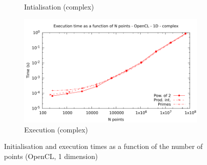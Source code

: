 \documentclass[12pt, a4paper]{article}
\begin{document}
\begin{figure}[H]
\begin{subfigure}{.5\textwidth}
\caption{Intialisation (complex)}
\label{FFTCL1DCI}
\end{subfigure}%
\begin{subfigure}{.5\textwidth}
\centering
\includegraphics[width=.9\linewidth]{graphs/fft-opencl-1d-pow2-c-exec.pdf}
\caption{Execution (complex)}
\label{FFTCL1DCE}
\end{subfigure}
\caption{Initialisation and execution times as a function of the number of points (OpenCL, 1 dimension)}
\label{FFTCL1D}
\end{figure}
\end{document}

